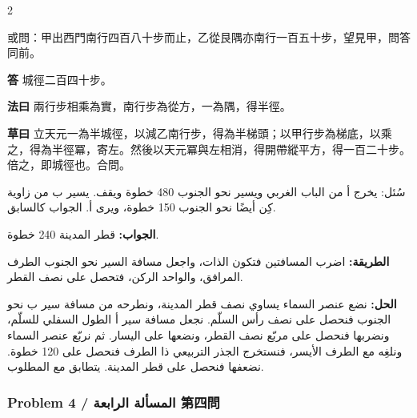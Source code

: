 \documentclass[11pt,a4paper]{article}
\newcommand{\ar}[1]{\arabicfont\beginR #1\endR}
\newcommand{\Answer}[1]{\par\noindent\textbf{\color{problemcolor}答} #1\par}
\newcommand{\Method}[1]{\par\noindent\textbf{\color{problemcolor}法曰} #1\par}
\newcommand{\Workings}[1]{\par\noindent\textbf{\color{problemcolor}草曰} #1\par}
\newcommand{\AnswerAr}{\par\noindent\textbf{\color{problemcolor}\ar{الجواب:}} }
\newcommand{\MethodAr}{\par\noindent\textbf{\color{problemcolor}\ar{الطريقة:}} }
\newcommand{\WorkingsAr}{\par\noindent\textbf{\color{problemcolor}\ar{الحل:}} }
\begin{document}
\begin{paracol}{2}

\noindent 或問：甲出西門南行四百八十步而止，乙從艮隅亦南行一百五十步，望見甲，問答同前。

\vspace{0.2cm}

\Answer{城徑二百四十步。}

\vspace{0.2cm}

\Method{兩行步相乘為實，南行步為從方，一為隅，得半徑。}

\vspace{0.2cm}

\Workings{立天元一為半城徑，以減乙南行步，得為半梯頭；以甲行步為梯底，以乘之，得為半徑冪，寄左。然後以天元冪與左相消，得開帶縱平方，得一百二十步。倍之，即城徑也。合問。}

\switchcolumn

\ar{سُئل: يخرج أ من الباب الغربي ويسير نحو الجنوب 480 خطوة ويقف. يسير ب من زاوية كِن أيضًا نحو الجنوب 150 خطوة، ويرى أ. الجواب كالسابق.}

\vspace{0.2cm}

\AnswerAr{قطر المدينة 240 خطوة.}

\vspace{0.2cm}

\MethodAr{اضرب المسافتين فتكون الذات، واجعل مسافة السير نحو الجنوب الطرف المرافق، والواحد الركن، فتحصل على نصف القطر.}

\vspace{0.2cm}

\WorkingsAr{نضع عنصر السماء يساوي نصف قطر المدينة، ونطرحه من مسافة سير ب نحو الجنوب فنحصل على نصف رأس السلّم. نجعل مسافة سير أ الطول السفلي للسلّم، ونضربها فنحصل على مربّع نصف القطر، ونضعها على اليسار. ثم نربّع عنصر السماء ونلغِه مع الطرف الأيسر، فنستخرج الجذر التربيعي ذا الطرف فنحصل على 120 خطوة. نضعفها فنحصل على قطر المدينة. يتطابق مع المطلوب.}

\end{paracol}

\vspace{0.5cm}

\subsubsection*{Problem 4 / \ar{المسألة الرابعة} \quad 第四問}
\end{document}

